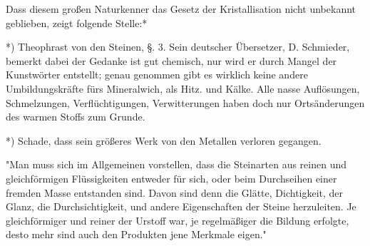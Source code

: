 \documentclass[a4paper, 11pt, oneside, polutonikogreek, german]{article}
\begin{document}
Dass diesem großen Naturkenner das Gesetz der Kristallisation nicht unbekannt geblieben, zeigt folgende Stelle:*

*) Theophrast von den Steinen, §. 3. Sein deutscher Übersetzer, D. Schmieder, bemerkt dabei der Gedanke ist gut chemisch, nur wird er durch Mangel der Kunstwörter entstellt; genau genommen gibt es wirklich keine andere Umbildungskräfte fürs Mineralwich, als Hitz. und Kälke. Alle nasse Auflösungen, Schmelzungen, Verflüchtigungen, Verwitterungen haben doch nur Ortsänderungen des warmen Stoffs zum Grunde.

*) Schade, dass sein größeres Werk von den Metallen verloren gegangen.

"Man muss sich im Allgemeinen vorstellen, dass die Steinarten aus reinen und gleichförmigen Flüssigkeiten entweder für sich, oder beim Durchseihen einer fremden Masse entstanden sind. Davon sind denn die Glätte, Dichtigkeit, der Glanz, die Durchsichtigkeit, und andere Eigenschaften der Steine herzuleiten. Je gleichförmiger und reiner der Urstoff war, je regelmäßiger die Bildung erfolgte, desto mehr sind auch den Produkten jene Merkmale eigen."
\end{document}
